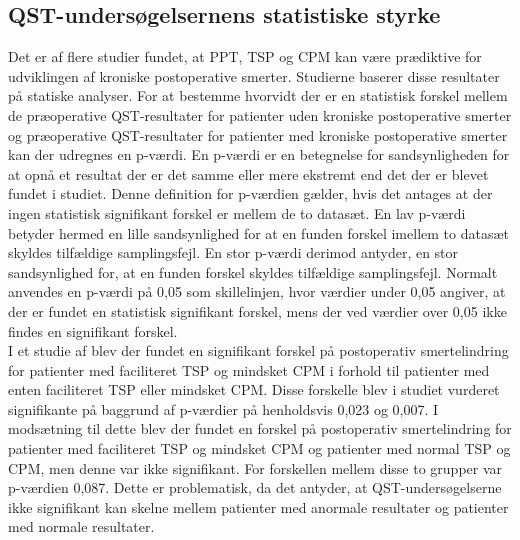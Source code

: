 \subsection{QST-undersøgelsernens statistiske styrke}
Det er af flere studier fundet, at PPT, TSP og CPM kan være prædiktive for udviklingen af kroniske postoperative smerter. \citep{Wylde2016c} \citep{Petersen2016} Studierne baserer disse resultater på statiske analyser. For at bestemme hvorvidt der er en statistisk forskel mellem de præoperative QST-resultater for patienter uden kroniske postoperative smerter og præoperative QST-resultater for patienter med kroniske postoperative smerter kan der udregnes en p-værdi. En p-værdi er en betegnelse for sandsynligheden for at opnå et resultat der er det samme eller mere ekstremt end det der er blevet fundet i studiet. Denne definition for p-værdien gælder, hvis det antages at der ingen statistisk signifikant forskel er mellem de to datasæt. En lav p-værdi betyder hermed en lille sandsynlighed for at en funden forskel imellem to datasæt skyldes tilfældige samplingsfejl. En stor p-værdi derimod antyder, en stor sandsynlighed for, at en funden forskel skyldes tilfældige samplingsfejl. Normalt anvendes en p-værdi på 0,05 som skillelinjen, hvor værdier under 0,05 angiver, at der er fundet en statistisk signifikant forskel, mens der ved værdier over 0,05 ikke findes en signifikant forskel. \citep{Zar2010} \\
I et studie af  blev der fundet en signifikant forskel på postoperativ smertelindring for patienter med faciliteret TSP og mindsket CPM i forhold til patienter med enten faciliteret TSP eller mindsket CPM. Disse forskelle blev i studiet vurderet signifikante på baggrund af p-værdier på henholdsvis 0,023 og 0,007. I modsætning til dette blev der fundet en forskel på postoperativ smertelindring for patienter med faciliteret TSP og mindsket CPM og patienter med normal TSP og CPM, men denne var ikke signifikant. For forskellen mellem disse to grupper var p-værdien 0,087. \citep{Petersen2016} Dette er problematisk, da det antyder, at QST-undersøgelserne ikke signifikant kan skelne mellem patienter med anormale resultater og patienter med normale resultater. \\ %
